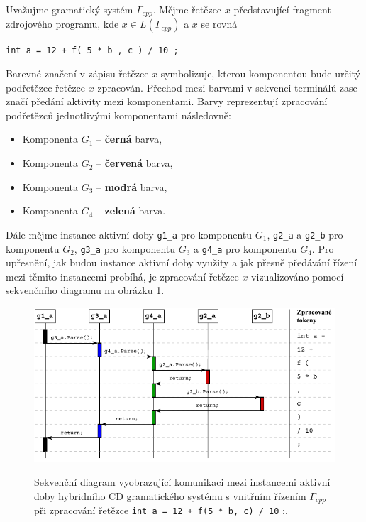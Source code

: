 \begin{priklad}
 Uvažujme gramatický systém $\Gamma_{cpp}$. Mějme řetězec $x$ představující fragment zdrojového programu, kde $x \in L(\Gamma_{cpp})$ a $x$ se rovná

  \begin{center}
    \texttt{int a = \textcolor[HTML]{0000FF}{12 +} \textcolor[HTML]{009900}{f(} \textcolor[HTML]{CC0000}{5 * b} \textcolor[HTML]{009900}{,} \textcolor[HTML]{CC0000}{c} \textcolor[HTML]{009900}{)} \textcolor[HTML]{0000FF}{/ 10} ;}
  \end{center}

  Barevné značení v zápisu řetězce $x$ symbolizuje, kterou komponentou bude určitý podřetězec řetězce $x$ zpracován. Přechod mezi barvami v sekvenci terminálů zase značí předání aktivity mezi komponentami. Barvy reprezentují zpracování podřetězců jednotlivými
  komponentami následovně:
  \begin{itemize}
    \item Komponenta $G_1$ -- \textcolor[HTML]{000000}{\textbf{černá}} barva,
    \item Komponenta $G_2$ -- \textcolor[HTML]{CC0000}{\textbf{červená}} barva,
    \item Komponenta $G_3$ -- \textcolor[HTML]{0000FF}{\textbf{modrá}} barva,
    \item Komponenta $G_4$ -- \textcolor[HTML]{009900}{\textbf{zelená}} barva.
  \end{itemize}

  Dále mějme instance aktivní doby \verb|g1_a| pro komponentu $G_1$, \verb|g2_a| a \verb|g2_b| pro komponentu $G_2$, \verb|g3_a| pro komponentu $G_3$
  a \verb|g4_a| pro komponentu $G_4$.
  Pro upřesnění, jak budou instance aktivní doby využity a jak přesně předávání řízení mezi těmito instancemi probíhá, je zpracování řetězce $x$ vizualizováno pomocí sekvenčního diagramu na
  obrázku \ref{obrSekvencniDiagramImplementace}.

  \begin{figure}[h]\centering
    \centering
    \includegraphics[scale=1.38]{obrazky/SekvencniDiagramImplementace.pdf}\\[1pt]
    \caption{Sekvenční diagram vyobrazující komunikaci mezi instancemi aktivní doby hybridního CD gramatického systému s vnitřním řízením $\Gamma_{cpp}$
     při zpracování řetězce \texttt{int~a~=~12~+~f(5 * b, c) / 10} ;.}
    \label{obrSekvencniDiagramImplementace}
  \end{figure}
\end{priklad}

